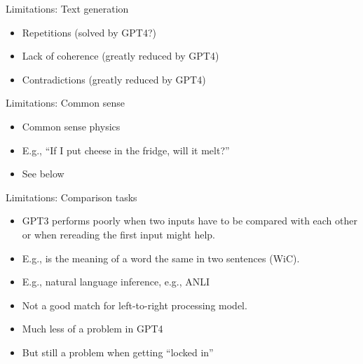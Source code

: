 
\begin{frame}{Limitations: Text generation}

\vfill

  \begin{itemize}
\item Repetitions (solved by GPT4?)
\item Lack of coherence (greatly reduced by GPT4)
\item Contradictions (greatly reduced by GPT4)
    \end{itemize}

\vfill

\end{frame}


\begin{frame}{Limitations: Common sense}

\vfill

  \begin{itemize}
\item Common sense physics
\item E.g., ``If I put cheese in the fridge, will it melt?''
\item See below
    \end{itemize}

\vfill

\end{frame}


\begin{frame}{Limitations: Comparison tasks}

\vfill
			
  \begin{itemize}
\item GPT3 performs poorly when two inputs have to be
compared with each other or when rereading the first input
might help.
\item E.g., is the meaning of a word the same in two
sentences (WiC).
\item E.g., natural language inference, e.g., ANLI
\item Not a good match for left-to-right processing model.
\item Much less of a problem in GPT4
\item But still a problem when getting ``locked in'' 
    \end{itemize}

\vfill

\end{frame}

